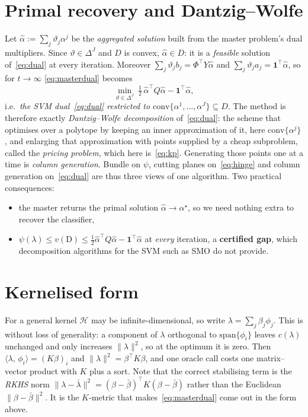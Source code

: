 \documentclass[11pt,a4paper]{report}
\newcommand{\Hs}{\mathcal{H}}
\newcommand{\one}{\mathbf{1}}
\newcommand{\inner}[2]{\langle #1,\, #2 \rangle}
\begin{document}
\section{Primal recovery and Dantzig--Wolfe}
\label{sec:dw}
Let $\hat\alpha:=\sum_j\vartheta_j\alpha^j$ be the \emph{aggregated solution} built
from the master problem's dual multipliers. Since $\vartheta\in\Delta^J$ and $D$ is
convex, $\hat\alpha\in D$: it is a \emph{feasible} solution of~\eqref{eq:dual} at
every iteration. Moreover $\sum_j\vartheta_jb_j=\Phi^{\!\top}Y\hat\alpha$ and
$\sum_j\vartheta_ja_j=\one^{\!\top}\hat\alpha$, so for $t\to\infty$
\eqref{eq:masterdual} becomes
\[
\min_{\vartheta\in\Delta^J}\ \tfrac12\,\hat\alpha^{\!\top}Q\hat\alpha-\one^{\!\top}\hat\alpha ,
\]
i.e.\ \emph{the SVM dual~\eqref{eq:dual} restricted to
$\mathrm{conv}\{\alpha^1,\dots,\alpha^J\}\subseteq D$}. The method is therefore exactly \emph{Dantzig--Wolfe decomposition} \cite{DW60}
of~\eqref{eq:dual}: the scheme that optimises over a polytope by keeping an inner
approximation of it, here $\mathrm{conv}\{\alpha^j\}$, and enlarging that
approximation with points supplied by a cheap subproblem, called the \emph{pricing
problem}, which here is~\eqref{eq:kp}. Generating those points one at a time is
\emph{column generation}. Bundle on $\psi$, cutting planes on~\eqref{eq:hinge} and
column generation on~\eqref{eq:dual} are thus three views of one algorithm. Two practical consequences:
\begin{itemize}
\item the master returns the primal solution $\hat\alpha\to\alpha^\star$, so we need
      nothing extra to recover the classifier,
\item $\psi(\lambda)\le v(\mathrm{D})\le
      \tfrac12\hat\alpha^{\!\top}Q\hat\alpha-\one^{\!\top}\hat\alpha$ at \emph{every}
      iteration, a \textbf{certified gap}, which decomposition algorithms for the
      SVM such as SMO do not provide.
\end{itemize}

\section{Kernelised form}
\label{sec:kernelised}
For a general kernel $\Hs$ may be infinite-dimensional, so write
$\lambda=\sum_j\beta_j\phi_j$. This is without loss of generality: a component of
$\lambda$ orthogonal to $\mathrm{span}\{\phi_i\}$ leaves $c(\lambda)$ unchanged and
only increases $\|\lambda\|^2$, so at the optimum it is zero. Then
$\inner{\lambda}{\phi_i}=(K\beta)_i$ and $\|\lambda\|^2=\beta^{\!\top}K\beta$, and one
oracle call costs one matrix--vector product with $K$ plus a sort. Note that the
correct stabilising term is the \emph{RKHS} norm
$\|\lambda-\bar\lambda\|^2=(\beta-\bar\beta)^{\!\top}K(\beta-\bar\beta)$ rather than
the Euclidean $\|\beta-\bar\beta\|^2$. It is the $K$-metric that
makes~\eqref{eq:masterdual} come out in the form above.
\end{document}
